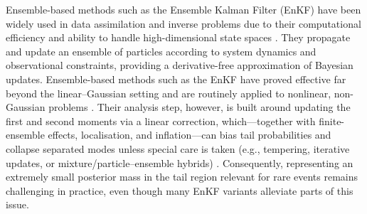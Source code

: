 \documentclass[a4paper]{article}
\numberwithin{equation}{section}
\begin{document}
Ensemble-based methods such as the Ensemble Kalman Filter (EnKF) have been widely used in data assimilation and inverse problems due to their computational efficiency and ability to handle high-dimensional state spaces \cite{evensen2009,reichcotter2015}. They propagate and update an ensemble of particles according to system dynamics and observational constraints, providing a derivative-free approximation of Bayesian updates. Ensemble-based methods such as the EnKF have proved effective far beyond the linear–Gaussian setting and are routinely applied to nonlinear, non-Gaussian problems \cite{evensen2003,evensen2009,reichcotter2015,vanleeuwen2010}. Their analysis step, however, is built around updating the first and second moments via a linear correction, which—together with finite-ensemble effects, localisation, and inflation—can bias tail probabilities and collapse separated modes unless special care is taken (e.g., tempering, iterative updates, or mixture/particle–ensemble hybrids) \cite{vanleeuwen2010,bocquet2010}. Consequently, representing an extremely small posterior mass in the tail region relevant for rare events remains challenging in practice, even though many EnKF variants alleviate parts of this issue.
\end{document}
